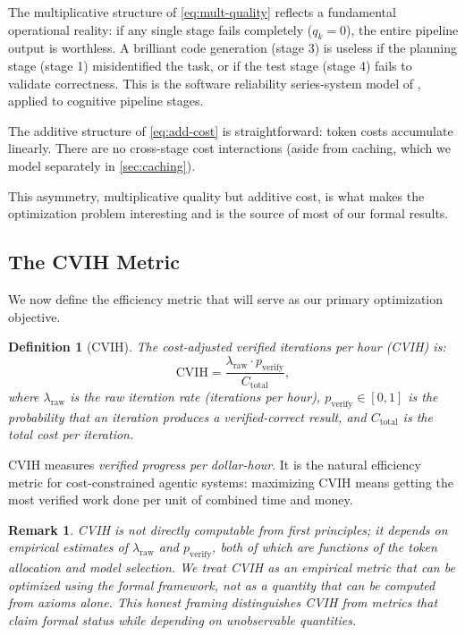 \documentclass[11pt, a4paper, logo, copyright]{googledeepmind}
\newtheorem{definition}{Definition}[section]
\newtheorem*{remark}{Remark}
\begin{document}
The multiplicative structure of \cref{eq:mult-quality} reflects a fundamental operational reality: if any single stage fails completely ($q_k = 0$), the entire pipeline output is worthless. A brilliant code generation (stage 3) is useless if the planning stage (stage 1) misidentified the task, or if the test stage (stage 4) fails to validate correctness. This is the software reliability series-system model of \citet{barlow1975}, applied to cognitive pipeline stages.

The additive structure of \cref{eq:add-cost} is straightforward: token costs accumulate linearly. There are no cross-stage cost interactions (aside from caching, which we model separately in \cref{sec:caching}).

This asymmetry, multiplicative quality but additive cost, is what makes the optimization problem interesting and is the source of most of our formal results.

\subsection{The CVIH Metric}

We now define the efficiency metric that will serve as our primary optimization objective.

\begin{definition}[CVIH]\label{def:cvih}
The \emph{cost-adjusted verified iterations per hour} (CVIH) is:
\begin{equation}\label{eq:cvih-def}
    \text{CVIH} = \frac{\lambda_{\text{raw}} \cdot p_{\text{verify}}}{C_{\text{total}}},
\end{equation}
where $\lambda_{\text{raw}}$ is the raw iteration rate (iterations per hour), $p_{\text{verify}} \in [0,1]$ is the probability that an iteration produces a verified-correct result, and $C_{\text{total}}$ is the total cost per iteration.
\end{definition}

CVIH measures \emph{verified progress per dollar-hour}. It is the natural efficiency metric for cost-constrained agentic systems: maximizing CVIH means getting the most verified work done per unit of combined time and money.

\begin{remark}
CVIH is not directly computable from first principles; it depends on empirical estimates of $\lambda_{\text{raw}}$ and $p_{\text{verify}}$, both of which are functions of the token allocation and model selection. We treat CVIH as an empirical metric that can be \emph{optimized} using the formal framework, not as a quantity that can be computed from axioms alone. This honest framing distinguishes CVIH from metrics that claim formal status while depending on unobservable quantities.
\end{remark}
\end{document}
